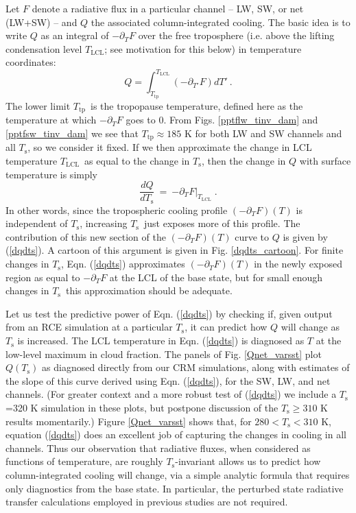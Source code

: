 \documentclass[10pt]{article}
\newcommand{\beqn}{\begin{equation}}
\newcommand{\eeqn}{\end{equation}}
\newcommand{\eqnref}[1]{(\ref{#1})}
\newcommand{\n}{\nonumber}
\newcommand{\der}[2]{\ensuremath{\frac{d #1}{d #2}}}
\newcommand{\ppt}{\ensuremath{\partial_T}}
\newcommand{\Ts}{\ensuremath{T_\mathrm{s}}}
\newcommand{\Tlcl}{\ensuremath{T_\mathrm{LCL}}}
\newcommand{\Ttp}{\ensuremath{T_\mathrm{tp}}}
\begin{document}
	Let $F$ denote a radiative flux in a particular channel -- LW, SW, or net (LW+SW) -- and $Q$ the associated column-integrated cooling. The basic idea is to write $Q$ as an integral of $-\ppt F$ over the free troposphere (i.e. above the lifting condensation level \Tlcl; see motivation for this below) in temperature coordinates: 
	\beqn
		Q =  \int_{\Ttp}^{\Tlcl} (-\partial_{T'} F) dT' \ . 
		\n
	\eeqn
The lower limit \Ttp\ is the tropopause temperature, defined here as the temperature at which $-\ppt F$ goes to 0. From Figs. \ref{pptflw_tinv_dam} and \ref{pptfsw_tinv_dam} we see that $\Ttp \approx 185$ K for both LW and SW channels and all \Ts, so we consider it fixed.    If we then approximate the change in LCL temperature \Tlcl\ as equal to the change in \Ts, then the change in $Q$ with surface temperature is  simply
	\beqn
		\der{Q}{\Ts} \ =\  \left.  -\ppt F\right|_{\Tlcl}  \; .
	\label{dqdts}
	\eeqn
In other words, since the tropospheric cooling profile $(-\ppt F)(T)$  is independent of \Ts, increasing \Ts\ just exposes more of this profile.  The contribution of this new section of the $(-\ppt F)(T)$ curve to $Q$ is given by \eqnref{dqdts}.  A cartoon of this argument is given in Fig. \ref{dqdts_cartoon}. For finite changes in \Ts, Eqn. \eqnref{dqdts} approximates $(-\ppt F)(T)$ in the newly exposed region as equal to $-\ppt F$ at the LCL of the base state, but for small enough changes in \Ts\ this approximation should be adequate.

Let us test the predictive power of Eqn. \eqnref{dqdts} by checking if, given output from an RCE simulation at a particular \Ts, it can predict how $Q$ will change as $\Ts$ is increased. The LCL temperature in Eqn. \eqnref{dqdts}  is diagnosed as $T$ at the low-level maximum in cloud fraction. The panels of Fig. \ref{Qnet_varsst} plot $Q(\Ts)$ as diagnosed directly from our CRM simulations, along with estimates of the slope of this curve derived using  Eqn. \eqnref{dqdts}, for the SW, LW, and net  channels. (For greater context and a more robust test of \eqnref{dqdts} we include a \Ts=320 K simulation in these plots, but postpone discussion of the $\Ts \geq 310$ K results momentarily.)  Figure \ref{Qnet_varsst} shows that, for $ 280 < \Ts < 310$ K,  equation \eqnref{dqdts} does an excellent job of capturing the changes in  cooling in all channels. Thus our observation that radiative fluxes, when considered as functions of temperature, are roughly \Ts-invariant allows us to  predict how column-integrated cooling will change, via a simple analytic formula that requires only diagnostics from the base state. In particular, the perturbed state radiative transfer calculations employed in previous studies \citep[e.g.][]{pendergrass2014,ogorman2012, held2006} are not required. 
\end{document}
